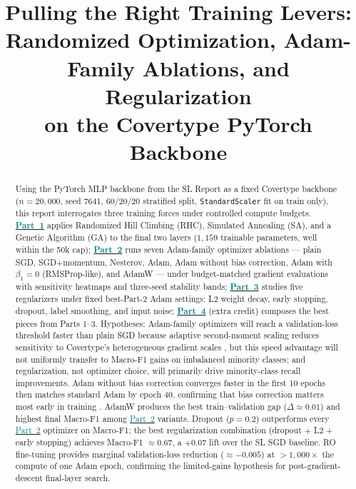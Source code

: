 \documentclass[conference]{IEEEtran}
\title{\color{denimdark}\textbf{Pulling the Right Training Levers:\\
Randomized Optimization, Adam-Family Ablations, and Regularization\\
on the Covertype PyTorch Backbone}}
\author{
  \IEEEauthorblockN{Timothy Leung}
  \IEEEauthorblockA{Georgia Institute of Technology, OMSCS\\
  CS 7641 --- Machine Learning, Summer 2026\\
  gtID 904150400 \quad \texttt{tleung37@gatech.edu}}
}
\newcommand{\partref}[2]{\hyperref[#2]{\textcolor{teal}{Part~#1}}}
\begin{document}
\graphicspath{{../results/figures/}{./results/figures/}}
\maketitle
\thispagestyle{plain}

\begin{abstract}
Using the PyTorch MLP backbone from the SL Report as a fixed Covertype backbone
($n{=}20{,}000$, seed 7641, 60/20/20 stratified split, \texttt{StandardScaler}
fit on train only), this report interrogates three training forces under
controlled compute budgets.
\textbf{\partref{1}{sec:p1}} applies Randomized Hill Climbing (RHC), Simulated Annealing
(SA), and a Genetic Algorithm (GA) to the final two layers
($1{,}159$ trainable parameters, well within the 50k cap);
\textbf{\partref{2}{sec:p2}} runs seven Adam-family optimizer ablations ---
plain SGD, SGD+momentum, Nesterov, Adam, Adam without bias correction,
Adam with $\beta_1{=}0$ (RMSProp-like), and AdamW --- under budget-matched
gradient evaluations with sensitivity heatmaps and three-seed stability bands;
\textbf{\partref{3}{sec:p3}} studies five regularizers under fixed best-Part-2 Adam settings:
L2 weight decay, early stopping, dropout, label smoothing, and input noise;
\textbf{\partref{4}{sec:p4}} (extra credit) composes the best pieces from Parts 1--3.
Hypotheses: Adam-family optimizers will reach a validation-loss threshold
faster than plain SGD because adaptive second-moment scaling reduces sensitivity
to Covertype's heterogeneous gradient scales \cite{kingma2014adam}, but this
speed advantage will not uniformly transfer to Macro-F1 gains on imbalanced
minority classes; and regularization, not optimizer choice, will primarily
drive minority-class recall improvements.
Adam without bias correction converges faster in the first 10 epochs then matches
standard Adam by epoch 40, confirming that bias correction matters most
early in training \cite{kingma2014adam}.
AdamW produces the best train--validation gap ($\Delta{\approx}0.01$) and
highest final Macro-F1 among \partref{2}{sec:p2} variants.
Dropout ($p{=}0.2$) outperforms every \partref{2}{sec:p2} optimizer on Macro-F1; the
best regularization combination (dropout $+$ L2 $+$ early stopping) achieves
Macro-F1 ${\approx}0.67$, a $+0.07$ lift over the SL SGD baseline.
RO fine-tuning provides marginal validation-loss reduction (${\approx}{-}0.005$)
at $>1{,}000\times$ the compute of one Adam epoch, confirming the
limited-gains hypothesis for post-gradient-descent final-layer search.
\end{abstract}
\end{document}
